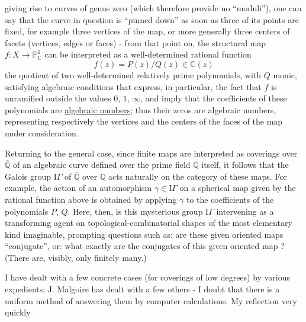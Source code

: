 
giving rise to curves of genus zero (which therefore
provide no ``moduli''), one can say that the curve
in question is ``pinned down'' as soon as three of its points are fixed, for
example three vertices of the map, or more generally three
centers of facets (vertices, edges or faces) - from that point on, the structural
map $f : X \to \mathbb{P}^{1}_{\mathbb{C}}$ can be interpreted as a
well-determined rational function
\[ f(z) = P(z)/Q(z) \in \mathbb{C}(z) \]
the quotient of two well-determined relatively prime polynomials,
with $Q$ monic, satisfying algebraic conditions
that express, in particular, the fact that $f$ is
unramified outside the values $0$, $1$, $\infty$, and imply that the
coefficients of these polynomials are \uline{algebraic numbers}; thus
their zeros are algebraic numbers, representing respectively
the vertices and the centers of the faces of the map under
consideration.

Returning to the general case, since finite maps are interpreted
as coverings over $\bar{\mathbb{Q}}$ of an algebraic curve defined
over the prime field $\mathbb{Q}$ itself, it follows that the Galois
group $\mathrm{I}\!\Gamma$ of $\bar{\mathbb{Q}}$ over $\mathbb{Q}$ acts naturally on the category of these
maps. For example, the action of an automorphism
$\gamma \in \mathrm{I}\!\Gamma$ on a spherical map given by the rational function
above is obtained by applying $\gamma$ to the coefficients of the
polynomials $P$, $Q$. Here, then, is this mysterious group $\mathrm{I}\!\Gamma$ intervening as
a transforming agent on topological-combinatorial shapes of the
most elementary kind imaginable, prompting questions
such as: are these given oriented maps ``conjugate'',
or: what exactly are the conjugates of this given oriented
map ? (There are, visibly, only finitely many.)

I have dealt with a few concrete cases (for coverings
of low degrees) by various expedients; J. Malgoire has dealt with
a few others - I doubt that there is a uniform method of
answering them by computer calculations. My reflection very quickly


